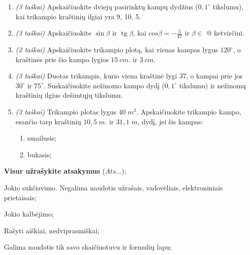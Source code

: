\documentclass[a4paper]{article}
\makeatletter
\DeclareMathOperator{\tg}{tg}
\newcommand*{\rom}[1]{\expandafter\@slowromancap\romannumeral #1@}
\makeatother
\begin{document}
\begin{enumerate}

      \item \textit{(3 taškai)} Apskaičiuokite dviejų pasirinktų kampų dydžius
            ($0,1^\circ$
            tikslumu), kai trikampio kraštinių ilgiai yra 9, 10, 5.

      \item \textit{(3 taškai)} Apskaičiuokite $\sin\beta$ ir $\tg \beta$, kai
            $cos \beta = -\frac{5}{47}$ ir $\beta \in$ \rom{3} ketvirčiui.

      \item \textit{(2 taškai)} Apskaičiuokite trikampio plotą, kai vienas
            kampas lygus
            $120^\circ$, o kraštinės prie šio kampo lygios
            $15\:cm.$ ir $3\:cm$.

      \item \textit{(3 taškai)} Duotas trikampis, kurio viena kraštinė lygi 37,
            o kampai prie jos
            $30^\circ$ ir $75^\circ$. Suskaičiuokite nežinomo kampo dydį
            ($0,1^\circ$ tikslumu) ir
            nežinomų kraštinių ilgius dešimtųjų tikslumu.

      \item \textit{(3 taškai)} Trikampio plotas lygus $40\; m^{2}$.
            Apskaičiuokite trikampio kampo, esančio tarp kraštinių $10,5\; m.$ ir $31,1\;
            m$, dydį, jei šis kampas: 
            \begin{enumerate}[label= (\alph*)]
                  \item smailusis;
                  \item bukasis;
            \end{enumerate}

\end{enumerate}

\begin{small}
      \begin{enumerate*}[label={(\arabic*)}]
            \item \textbf{Visur užrašykite atsakymus} ($Ats\ldots$);
            \item Jokio sukčiavimo. Negalima naudotis užrašais, vadovėliais,
            elektroniniais prietaisais;
            \item Jokio kalbėjimo;
            \item Rašyti aiškiai, nedviprasmiškai;
            \item Galima naudotis tik savo skaičiuotuvu ir formulių lapu;
      \end{enumerate*}
\end{small}
\end{document}
